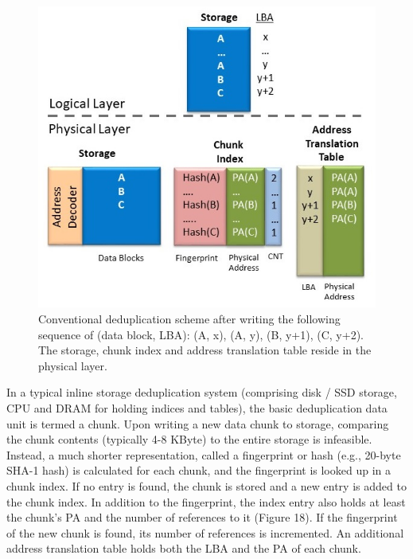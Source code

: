 \documentclass{superfri}
\begin{document}
\begin{figure}[ht!]
	\centerline{\includegraphics[scale=0.6]{Figures/dedup_PC.jpg}}
	\caption{Conventional deduplication scheme after writing the following sequence of (data block, LBA): (A, x), (A, y), (B, y+1), (C, y+2). The storage, chunk index and address translation table reside in the physical layer.}
	\label{fig:dedup_PC}
\end{figure}

In a typical inline storage deduplication system (comprising disk / SSD storage, CPU and DRAM for holding indices and tables), the basic deduplication data unit is termed a chunk. Upon writing a new data chunk to storage, comparing the chunk contents (typically 4-8 KByte) to the entire storage is infeasible. Instead, a much shorter representation, called a fingerprint or hash (e.g., 20-byte SHA-1 hash) is calculated for each chunk, and the fingerprint is looked up in a chunk index. If no entry is found, the chunk is stored and a new entry is added to the chunk index. In addition to the fingerprint, the index entry also holds at least the chunk's PA and the number of references to it (Figure 18). If the fingerprint of the new chunk is found, its number of references is incremented. An additional address translation table holds both the LBA and the PA of each chunk.
\end{document}
